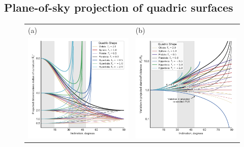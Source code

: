 \subsection{Plane-of-sky projection of quadric surfaces} 

\begin{figure}
  \centering
  \begin{tabular}{@{}ll@{}}
    (a) & (b) \\
    \includegraphics{figs/projected-Rc-vs-i}
        & \includegraphics{figs/projected-R0-vs-i} \\

\end{tabular}
\end{figure}
